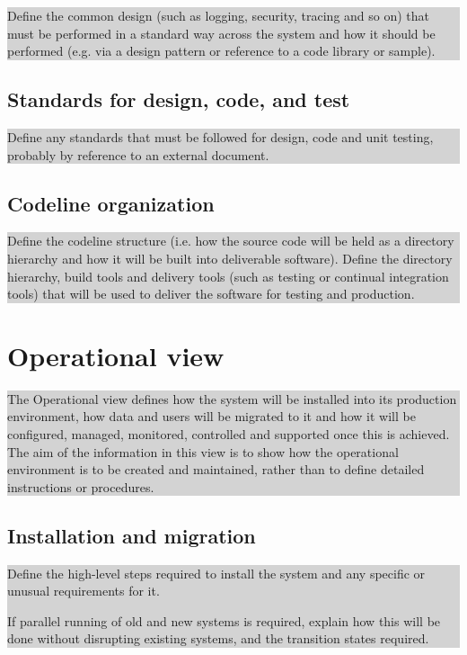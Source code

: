 \documentclass[a4paper,11pt]{report}
\newcommand{\instructions}[1]{
  \noindent\colorbox{lightgray}{%
    \parbox{\linewidth}{%
      #1
    }%
  }%
 \vspace{0.1cm}
}
\begin{document}
\instructions{
Define the common design (such as logging, security, tracing and so
on) that must be performed in a standard way across the system and how
it should be performed (e.g. via a design pattern or reference to a
code library or sample).
}

\subsection{Standards for design, code, and test}
\label{sec:stand-design-code}

\instructions{
Define any standards that must be followed for design, code and unit
testing, probably by reference to an external document.
}

\subsection{Codeline organization}
\label{sec:codel-organ}

\instructions{
Define the codeline structure (i.e. how the source code will be held
as a directory hierarchy and how it will be built into deliverable
software). Define the directory hierarchy, build tools and delivery
tools (such as testing or continual integration tools) that will be
used to deliver the software for testing and production.
}

\section{Operational view}
\label{sec:operational-view}

\instructions{
The Operational view defines how the system will be installed into its
production environment, how data and users will be migrated to it and
how it will be configured, managed, monitored, controlled and
supported once this is achieved. The aim of the information in this
view is to show how the operational environment is to be created and
maintained, rather than to define detailed instructions or procedures.
}
\subsection{Installation and migration}
\label{sec:inst-migr}

\instructions{
Define the high-level steps required to install the system and any
specific or unusual requirements for it.

If parallel running of old and new systems is required, explain how
this will be done without disrupting existing systems, and the
transition states required.
}
\end{document}
